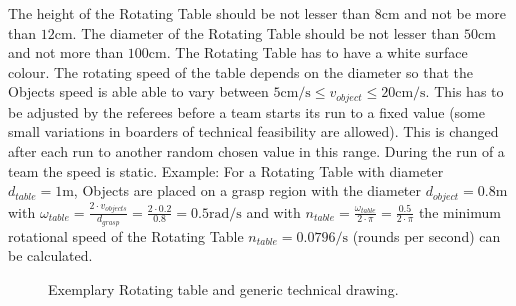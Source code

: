 The height of the Rotating Table should be not lesser than $8\si{\centi\meter}$ and not be more than $12\si{\centi\meter}$. The diameter of the Rotating Table should be not lesser than $50\si{\centi\meter}$ and not more than $100\si{\centi\meter}$. The Rotating Table has to have a white surface colour. The rotating speed of the table depends on the diameter so that the Objects speed is able able to vary between $5 \si{\centi\meter\per\second} \le v_{object} \le 20 \si{\centi\meter\per\second}$. This has to be adjusted by the referees before a team starts its run to a fixed value (some small variations in boarders of  technical feasibility are allowed). This is changed after each run to another random chosen value in this range. During the run of a team the speed is static. Example: For a Rotating Table with diameter $d_{table}=1\si{\meter}$, Objects are placed on a grasp region with the diameter $d_{object}=0.8\si{\meter}$ with $\omega_{table} = \frac{2 \cdot v_{objects} }{d_{grasp}}=\frac{2 \cdot 0.2}{0.8}=0.5\si{\radian\per\second}$ and with $n_{table}=\frac{\omega_{table}}{2 \cdot \pi}=\frac{0.5}{2 \cdot \pi}$ the minimum rotational speed of the Rotating Table $n_{table}= 0.0796 \si{\per\second}$ (rounds per second) can be calculated.  

\begin{figure}[h!]
	\centering
	\hspace{0.05\textwidth}
	\caption{Exemplary Rotating table and generic technical drawing.}%
	\label{fig:rottable}
\end{figure}



